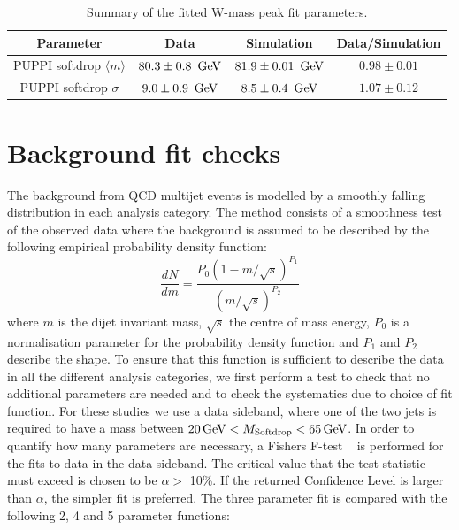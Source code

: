 \begin{table}[!htb]
 \begin{center}

 \begin{tabular}{c|c|c|c}
  Parameter & Data & Simulation & Data/Simulation \\
  \hline
  PUPPI softdrop $\langle m \rangle$ & $80.3 \pm 0.8~{\rm \,\text{Ge\hspace{-.08em}V}}$ & $81.9 \pm 0.01~{\rm \,\text{Ge\hspace{-.08em}V}}$ & $0.98 \pm 0.01$ \\%
  PUPPI softdrop $\sigma$            & $ 9.0 \pm 0.9~{\rm \,\text{Ge\hspace{-.08em}V}}$ &  $8.5 \pm 0.4~{\rm \,\text{Ge\hspace{-.08em}V}}$  & $1.07 \pm 0.12$ \\%
  \hline
 \end{tabular}
 \caption{Summary of the fitted W-mass peak fit parameters.}
 \label{tab:searchII:wtagparams}
 \end{center}
\end{table}

\section{Background fit checks}
\label{app:2016xcheck}

The background from QCD multijet events is modelled by a smoothly falling distribution in each analysis category. The method consists of a smoothness test of the observed data where the background is assumed to be described by the following empirical probability density function:
\begin{equation}
\label{eq:dijet}
\frac{dN}{dm}= \frac{ P_0(1-m/\sqrt{s})^{P_1} } { (m/\sqrt{s})^{P_2} }
\end{equation}
where $m$ is the dijet invariant mass, $\sqrt{s}$ the centre of mass energy, $P_0$ is a normalisation parameter for the probability density function and $P_1$ and $ P_2$ describe the shape. To ensure that this function is sufficient to describe the data in all the different analysis categories, we first perform a test to check that no additional parameters are needed and to check the systematics due to choice of fit function. For these studies we use a data sideband, where one of the two jets is required to have a mass between $20 \,\text{Ge\hspace{-.08em}V} < M_{\rm{Softdrop}} < 65 \,\text{Ge\hspace{-.08em}V}$. In order to quantify how many parameters are necessary, a Fishers F-test ~\cite{RePEc:bla:istatr:v:80:y:2012:i:3:p:491-491} is performed for the fits to data in the data sideband. The critical value that the test statistic must exceed is chosen to be $\alpha > $ 10\%. If the returned Confidence Level is larger than $\alpha$, the simpler fit is preferred.
The three parameter fit is compared with the following 2, 4 and 5 parameter functions:

